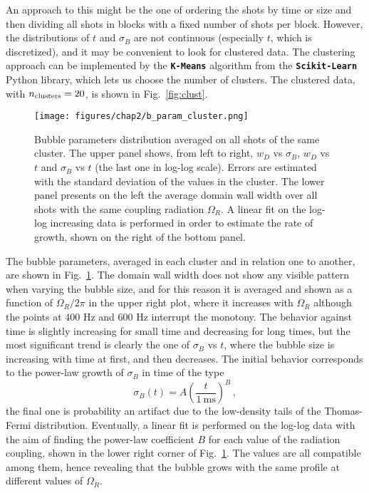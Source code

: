 An approach to this might be the one of ordering the shots by time or size and then dividing all shots in blocks with a fixed number of shots per block. However, the distributions of $t$ and $\sigma_B$ are not continuous (especially $t$, which is discretized), and it may be convenient to look for clustered data. 
The clustering approach can be implemented by the \texttt{\textbf{K-Means}} algorithm from the \texttt{\textbf{Scikit-Learn}} Python library, which lets us choose the number of clusters. The clustered data, with $n_{\rm clusters} = 20$, is shown in Fig.\ \ref{fig:clust}. 
\begin{figure}[ht!]
    \centering
    \texttt{[image: figures/chap2/b\_param\_cluster.png]}
    \caption{Bubble parameters distribution averaged on all shots of the same cluster. The upper panel shows, from left to right, $w_D$ vs $\sigma_B$, $w_D$ vs $t$ and $\sigma_B$ vs $t$ (the last one in log-log scale). Errors are estimated with the standard deviation of the values in the cluster. The lower panel presents on the left the average domain wall width over all shots with the same coupling radiation $\Omega_R$. A linear fit on the log-log increasing data is performed in order to estimate the rate of growth, shown on the right of the bottom panel.}
    \label{fig:b_param}
\end{figure}

The bubble parameters, averaged in each cluster and in relation one to another, are shown in Fig.\ \ref{fig:b_param}. The domain wall width does not show any visible pattern when varying the bubble size, and for this reason it is averaged and shown as a function of $\Omega_R/2\pi$ in the upper right plot, where it increases with $\Omega_R$ although the points at 400 Hz and 600 Hz interrupt the monotony. The behavior against time is slightly increasing for small time and decreasing for long times, but the most significant trend is clearly the one of $\sigma_B$ vs $t$, where the bubble size is increasing with time at first, and then decreases. The initial behavior corresponds to the power-law growth of $\sigma_B$ in time of the type
\[
    \sigma_B(t) = A\left(\frac{t}{1\ \unit{\milli\second}}\right)^B\, , 
\]
the final one is probability an artifact due to the low-density tails of the Thomas-Fermi distribution. Eventually, a linear fit is performed on the log-log data with the aim of finding the power-law coefficient $B$ for each value of the radiation coupling, shown in the lower right corner of Fig.\ \ref{fig:b_param}. The values are all compatible among them, hence revealing that the bubble grows with the same profile at different values of $\Omega_R$.

